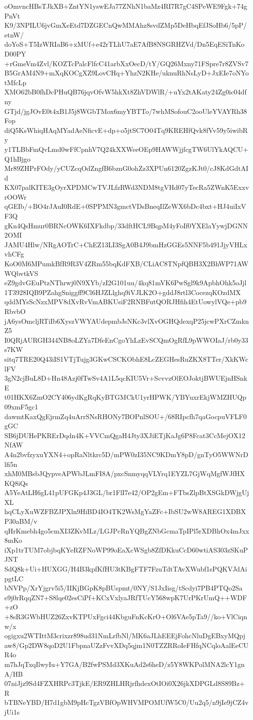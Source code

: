 oOmvncHBsTJkXB+ZntYN1yswEJa77ZNhN1baMz4RI7R7gC4SPeWE9Fgk+74gPnVt
K9/3NPILU6jvGmXeEtd7DZGECnQwMMAhz8svdZMp5DeHbqEfJSoHb6/5pP/etnW/
doYoS+T5IzWRIaB6+xMUf+e42rTLhU7aE7AfB8NSGRHZVd/Dn5EqESiTnKoD00PY
+rGmeVm4Zvl/KOZTcPalcFlfcC41arbXxOecD/tY/GQ26Mxny71FSpre7r8ZVSv7
B5GrAM4N9+mXqKOCgXZ9LovCHq+YhzN2KHe/uknuRhNsLyD+JxEIe7oNYotMfcLp
XMO62bB0fhDcPHuQB76jqvOfvW5hkXt8ZhVDWlR/+uYx2tAKaty24Zg0ic04dfny
GTjd/jgJOvE0t4xB1J5j8WGbTMox6myYBTTo/7whMSofouC2ooUleYVAYRh38Fop
diQ5KsWhiqHAqMYadAeNficvE+dp+o5jtSC7O04Tq9KREHfQvk8fVv59y5iwibRy
y1TLBbFmQvLmd0wFfCpnhV7Q24kXXWeeOEp9HAWWjjfcgTW6UlYkAQCU+Q1hBjgo
Mr89ZHPrFOdy/yCUZcqOdZngfB6bznG0ohZz3XPUn6120ZgzKJt0/cJ8KdGdtAId
KX07palKITE3gOyrXPDMCwTVJLfzRWd3NDM8tgVHd07yTecRa5ZWnK5ExxvrOOWr
qGEIb/+BO4rJAuI0RdE+0SPPMN3gmctVDsBneqIlZeWX6bDc4bxt+HJ4uiIxVF3Q
gKn4QsHmur0BRNcOWK6IXFkdbp/33dftHCL9BqpM4yFoIf0YXElaYywjDGNN2OMI
JAMU4Hlw/NRgAOTrC+ChEZ13LI3SgA0B4J9bmHzGGEs5NNF5b491JjyVHLxvhCFg
KoO0M6MPumkBfR9R3V4ZRm55bqKdFXB/CLiAC8TNpfQBH3X2BhWP71AWWQbvtkVS
eZ9gdvGEuPtzNThrwj0N9XYb/zI2G101uu/4kq81mVK6PwSgl9k9ApbhOhk5oJjl
1T3928IQB9PZahgSniggff9Cl6HJZLlghq9iVJLK2O+gddJ8rtl3CocezqKOzdMX
qddMYsScNzxMPV8dXvRvVmABKUsiF2RNBFutQORJHfih4EtUowylVQe+pb9RbvbO
jA6ysOmcljRTiIb6XyszVWYAUdepmbJsNKc3vlXvOGHQdexqP25jcwPXrCZmknZ5
I0QRjAURGH344NB8oLZYa7DfeEnCgoYhLzEvSCQmOgRfL9pWWOIaJ/rb0y33s7KW
sitq7TRE20Q43iIS1VTjTujg3GKwCSCKObhE8LcZEGHesRuZKX8TTer/XkKWclFV
3gN2cjBuL8D+Hn48Azj0fTwSv4A1L5qcKIU5Vr+ScvvzOlEOJoktjBWUEjnHSnkE
t01HKX6ZmO2CY406ydKgRqKyBTGMCkU1yrHPWK/YBYuxrEkjWMZHUQp09xmF5gc1
dawmtKaxQgEjrmZq4uArrSNsRHONy7BOPnlSOU+/68RIpcfh7qaGocpuVFLF0gGC
SB6jDUHePKRErDqdn4K+VVCmQgaH4Jty3XJiETjKaJg6P8Fcat3CcMejOX12NfAW
A4n2bvfzyxuYXN4+opRaNltkrc5D/mPW0zI35NC9KDmY8pD/gnTyO5WWNrDlfi5n
xhM0MBsbJQypveAPWbJLmFI8A/pxcSnmyqqVLYrq1EYZL7GjWqMgfWJfHXKQ8iQs
A5YeAtLH6gL41pUFGKp4J3GL/br1FlI7e42/OP2gEm+FTbsZlpBtXSGkDWjgUjXL
hqCLyXuWZFBZJPXln9HiBD4IO4TK2WsMgYaZFc+IbSU2wW8AREG1XDBXP30aBM/v
qHrKmebh4go5cmXI3ZKvMLz/LGJPcRnYQBgZNbGcmaTpIPl5rXDBhOx4mJxx8mKo
iXp1trTUM7objbqKYeRZFNoWP99oEaXcWSgb8ZfDKkuCcD60wtiAS303zSKuPJNT
SdQ8k+Ui+HUXGG/H4B3kpfKfHU3tKBgFTF7FzuTdtTAvXWubf1sPQKVJdAipgtLC
bNVPp/XrYjgrv5i5/IIKjBGpK8pBUspmt/0NY/S1JxIisg/tScdyi7PB4PTQo2Sa
e9j0rRqqZN7+S8lqe02esCiPf+KCxVxlyaJRfTUcY568wpK7UrPKrUmQ++WDF+zO
+8sR3GWbHUZ26ZxvKTPUxFgci44KbguFnKcKrO+Ol6VAe5pTa9//ko+VlCiqnw/x
ogigxu2WTIttM3crixzr898ud31NmLrfbNl/MK6aJLhEEEjFohcNluDgEBxyMQpj
aw8/Gp2DW8qoD2U1FbpnaUZzFvvXDq5qjm1N0TZZRRoIeFHfqNCqloAalEeCUR4o
m7hJqTxqIlwyIu+Y7GA/B2fwPSMd3XKuAd2s6heD/z5Y8WKPolMNA2lcY1gnA/HB
07niJjz9Sd4FZXHRPc3TjkE/ER9ZHLHRjrfhdexOtIOi0X26jkXDPGLd8S89Bz+R
bTBNeYBD/H7d1gbM9pHcTgzVBfOpWHVMPOMUfW5C0/Uu2q5/n9jIe9jCZ4vjUi1s
